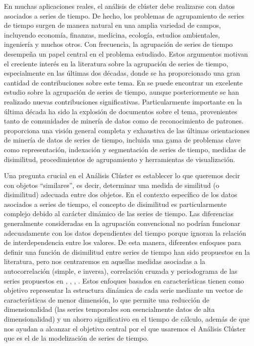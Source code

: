 \documentclass[12pt,oneside]{book}\usepackage[]{graphicx}\usepackage[]{color}
\theoremstyle{definition} %
\begin{document}
En muchas aplicaciones reales, el análisis de clúster debe realizarse con datos asociados a series de tiempo. 
De hecho, los problemas de agrupamiento de series de tiempo surgen de manera natural en una amplia variedad de campos, incluyendo economía, finanzas, medicina, ecología, estudios ambientales, ingeniería y muchos otros. Con frecuencia, la agrupación de series de tiempo desempeña un papel central en el problema estudiado. Estos argumentos motivan el creciente interés en la literatura sobre la agrupación de series de tiempo, especialmente en las últimas dos décadas, donde se ha proporcionado una gran cantidad de contribuciones sobre este tema. En  \citeauthor{liao2005clustering} \citeyear{liao2005clustering} se puede encontrar un excelente estudio sobre la agrupación de series de tiempo, aunque posteriormente se han realizado nuevas contribuciones significativas. 
Particularmente importante en la última década ha sido la explosión de documentos sobre el tema, provenientes tanto de comunidades de minería de datos como de reconocimiento de patrones. \citeauthor{fu2011review} \citeyear{fu2011review} proporciona una visión general completa y exhaustiva de las últimas orientaciones de minería de datos de series de tiempo, incluida una gama de problemas clave como representación, indexación y segmentación de series de tiempo, medidas de disimilitud, procedimientos de agrupamiento y herramientas de visualización.


Una pregunta crucial en el Análisis Clúster es establecer lo que queremos decir con objetos ``similares'', es decir, determinar una medida de similitud (o disimilitud) adecuada entre dos objetos. En el contexto específico de los datos asociados a series de tiempo, el concepto de disimilitud es particularmente complejo debido al carácter dinámico de las series de tiempo. Las diferencias generalmente consideradas en la agrupación convencional no podrían funcionar adecuadamente con los datos dependientes del tiempo porque ignoran la relación de interdependencia entre los valores. De esta manera, diferentes enfoques para definir una función de disimilitud entre series de tiempo han sido propuestos en la literatura, pero nos centraremos en aquellas medidas asociadas a la autocorrelación (simple, e inversa), correlación cruzada y periodograma de las series propuestos en \citeauthor{struzik1999haar} \citeyear{struzik1999haar}, \citeauthor{galeano2000multivariate} \citeyear{galeano2000multivariate}, \citeauthor{caiado2006periodogram} \citeyear{caiado2006periodogram}, \citeauthor{chouakria2007adaptive} \citeyear{chouakria2007adaptive} . Estos enfoques basados en características tienen como objetivo representar la estructura dinámica de cada serie mediante un vector de características de menor dimensión, lo que permite una reducción de dimensionalidad (las series temporales son esencialmente datos de alta dimensionalidad) y un ahorro significativo en el tiempo de cálculo, además de que nos ayudan a alcanzar el objetivo central por el que usaremos el Análisis Clúster que es el de la modelización de series de tiempo.
\end{document}

